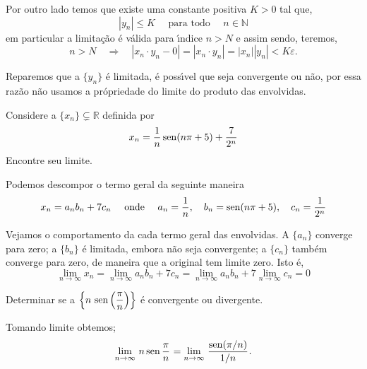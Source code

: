 Por outro lado temos que existe uma constante positiva $K>0$ tal que,
 \begin{equation*}
    |y_n|\leq K \quad \text{ para todo }\quad n\in \mathbb{N}
 \end{equation*}
 em particular a limita\c{c}\~{a}o \'{e} v\'{a}lida para \'{\i}ndice $n>N$ e assim sendo, teremos,
 \begin{equation*}
   n>N \quad \Rightarrow\quad  |x_n\cdot y_n-0|=|x_n\cdot y_n|=|x_n||y_n|<K\varepsilon.
 \end{equation*}

\begin{note}
Reparemos que a \seq $\{y_n\}$ \'{e} limitada, \'{e} poss\'{\i}vel que seja convergente ou n\~{a}o, por essa raz\~{a}o n\~{a}o usamos a pr\'{o}priedade do limite do produto das \seqs envolvidas.
\end{note}

\begin{exer}
Considere a \seq $\{x_n\}\subsetneq \mathbb{R}$ definida por
\begin{equation*}
    x_n=\frac{1}{n}\operatorname{sen}(n\pi+5)+\frac{7}{2^n}
\end{equation*}
Encontre seu limite.
\end{exer}

\solo Podemos descompor o termo geral da seguinte maneira
\begin{equation*}
    x_n=a_nb_n+7c_n\quad\text{ onde }\quad a_n=\frac{1}{n},\quad b_n=\operatorname{sen}(n\pi+5),\quad c_n=\frac{1}{2^n}
\end{equation*}

Vejamos  o comportamento da cada termo geral das \seqs envolvidas. A \seq $\{a_n\}$ converge para zero; a \seq $\{b_n\}$ \'{e} limitada, embora n\~{a}o seja convergente; a \seq $\{c_n\}$ tamb\'{e}m converge para zero, de maneira que a \seq original tem limite zero. Isto \'{e},
\begin{equation*}
    \lim_{n\to \infty }x_n=\lim_{n\to \infty}a_nb_n+7c_n=\lim_{n\to \infty}a_nb_n+7\lim_{n\to \infty}c_n=0
\end{equation*}

\begin{exer}
Determinar se a \seq $\displaystyle{\left\{n\,\operatorname{sen}\left(\frac{\pi}{n}\right)\right\}}$ \'{e}
convergente ou divergente.
\end{exer}

\solo Tomando limite obtemos;
\begin{equation*}
\displaystyle{\lim_{n\to \infty}\,{n\operatorname{sen}\frac{ \pi }{n}}_{}}=\displaystyle{\lim_{n\to \infty}\,{\frac{\operatorname{sen}(\pi/n)}{1/n}}_{}}.
\end{equation*}


